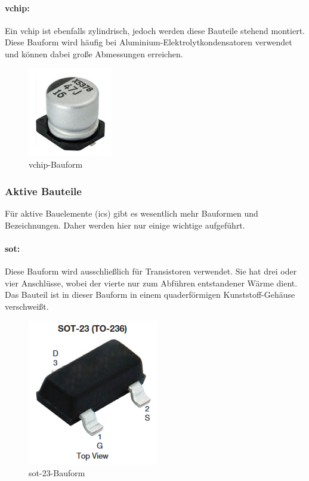 \paragraph{\ac{vchip}:}
Ein \ac{vchip} ist ebenfalls zylindrisch, jedoch werden diese Bauteile stehend montiert.
Diese Bauform wird häufig bei Aluminium-Elektrolytkondensator\-en verwendet und können dabei große Abmessungen erreichen.
\begin{figure}[H]
	\centering
	\includegraphics{images/technische_grundlagen/vchip.png}
	\caption{\ac{vchip}-Bauform \cite[vgl.][]{vishay-vchip}}
\end{figure}

\subsubsection{Aktive Bauteile}
Für aktive Bauelemente (\acp{ic}) gibt es wesentlich mehr Bauformen und Bezeichnungen. Daher werden hier nur einige wichtige aufgeführt.
\paragraph{\ac{sot}:}
Diese Bauform wird ausschließlich für Transistoren verwendet. Sie hat drei oder vier Anschlüsse, wobei der vierte nur zum Abführen entstandener Wärme dient. Das Bauteil ist in dieser Bauform in einem quaderförmigen Kunststoff-Gehäuse verschweißt.
\begin{figure}[H]
	\centering
	\includegraphics{images/technische_grundlagen/sot-23.png}
	\caption{\ac{sot}-23-Bauform \cite[vgl.][]{vishay-sot}}
\end{figure}

